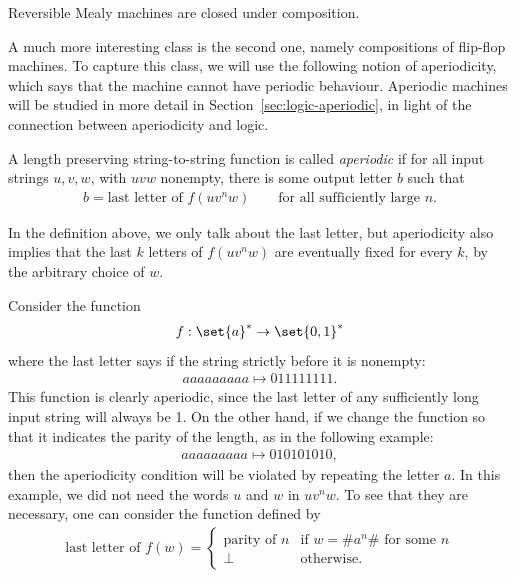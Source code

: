 \begin{lemma}\label{lem:reversible-composition}
    Reversible Mealy machines are closed under composition.
\end{lemma}

A much more interesting class is the second one, namely compositions of flip-flop machines. To capture this class, we will use the following notion of aperiodicity, which says that the machine cannot have periodic behaviour. Aperiodic machines will be studied in more detail in Section~\ref{sec:logic-aperiodic}, in light of the connection between aperiodicity and logic.

\begin{definition}[Aperiodic]\label{def:aperiodic-mealy}
    A length preserving string-to-string function is called \emph{aperiodic} if for all input strings $u,v,w$, with $uvw$ nonempty, there is some output letter $b$ such that \begin{align*}
    b = \text{last letter of $f(uv^nw)$}  \qquad \text{for all sufficiently large $n$}.
    \end{align*}
\end{definition}

In the definition above, we only talk about the last letter, but aperiodicity also implies that the last $k$ letters of $f(uv^nw)$ are eventually fixed for every $k$, by the arbitrary choice of $w$.


\begin{myexample}
    \label{ex:size-threshold-3}
Consider the function 
\begin{align*}
f : \set{a}^* \to \set{0,1}^*
\end{align*}
where the last letter says if the string strictly before it is nonempty:
\begin{align*}
    aaaaaaaaa \mapsto 011111111.
\end{align*}
This function is clearly aperiodic, since the last letter of any sufficiently long input string will always be 1. On the other hand, if we change the function so that it indicates the parity of the length, as in the following example: 
\begin{align*}
    aaaaaaaaa \mapsto 010101010, 
\end{align*}
then the  aperiodicity condition will be  violated by repeating the letter $a$. In this example, we did not need the words $u$ and $w$ in $uv^nw$. To see that they are necessary, one can consider the function defined by 
\begin{align*}
\text{last letter of }f(w) = 
\begin{cases}
     \text{parity of $n$} & \text{if $w = \#a^n\#$ for some $n$}\\
     \bot & \text{otherwise.}
\end{cases}
\end{align*}
\end{myexample}


